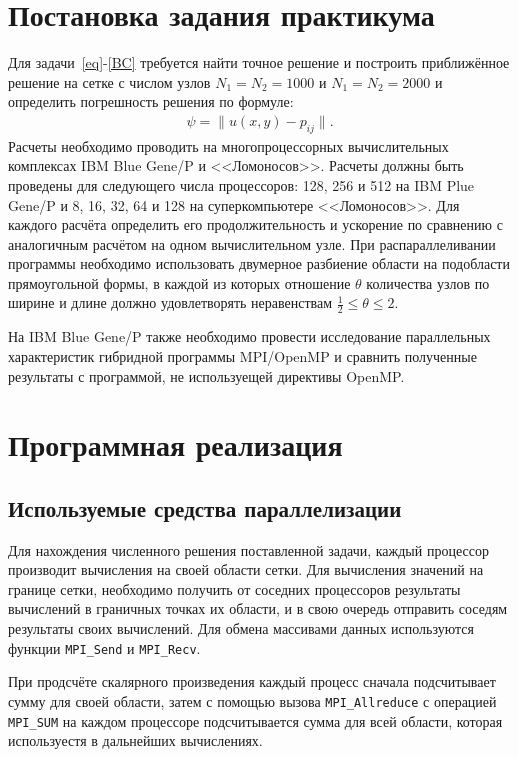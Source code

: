\documentclass[11pt]{article}
\numberwithin{equation}{section}
\theoremstyle{plain}
\theoremstyle{definition}
\begin{document}
\section{Постановка задания практикума}
Для задачи~\eqref{eq}-\eqref{BC} требуется найти точное решение и построить
приближённое решение на сетке с числом узлов $N_1 = N_2 = 1000$ и
$N_1 = N_2 = 2000$ и определить погрешность решения по формуле:
\[\begin{aligned}
    \psi=\|u(x,y)-p_{ij}\|.
\end{aligned}\]
Расчеты необходимо проводить на многопроцессорных вычислительных комплексах IBM
Blue Gene/P и <<Ломоносов>>.
Расчеты должны быть проведены для следующего числа процессоров: 128, 256 и 512 на
IBM Plue Gene/P и  8, 16, 32, 64 и 128 на суперкомпьютере <<Ломоносов>>.
Для каждого расчёта определить его
продолжительность и ускорение по сравнению с аналогичным расчётом на одном
вычислительном узле.  При распараллеливании программы необходимо использовать
двумерное разбиение области на подобласти прямоугольной формы, в каждой из
которых отношение $\theta$ количества узлов по ширине и длине должно удовлетворять
неравенствам $\frac{1}{2} \leqslant \theta \leqslant 2$.

На IBM Blue Gene/P также необходимо провести исследование параллельных
характеристик гибридной программы MPI/OpenMP и сравнить полученные результаты с
программой, не используещей директивы OpenMP.

\section{Программная реализация}
\subsection{Используемые средства параллелизации}
Для нахождения численного решения поставленной задачи, каждый процессор
производит вычисления на своей области сетки. Для вычисления значений на
границе сетки, необходимо получить от соседних процессоров результаты вычислений
в граничных точках их области, и в свою очередь отправить соседям результаты
своих вычислений. Для обмена массивами данных используются функции
\verb|MPI_Send| и \verb|MPI_Recv|.

При продсчёте скалярного произведения каждый процесс сначала подсчитывает сумму
для своей области, затем с помощью вызова \verb|MPI_Allreduce| с операцией
\verb|MPI_SUM| на каждом процессоре подсчитывается сумма для всей области,
которая используестя в дальнейших вычислениях.
\end{document}
